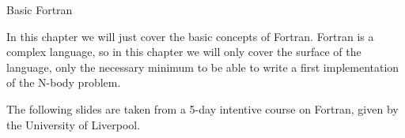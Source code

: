 
 {Basic Fortran}
\label{sec:basic-fortran}

In this chapter we will just cover the basic concepts of Fortran. Fortran is a
complex language, so in this chapter we will only cover the surface of the
language, only the necessary minimum to be able to write a first implementation
of the N-body problem.

The following slides are taken from a 5-day intentive course on Fortran, given by the
University of Liverpool.






